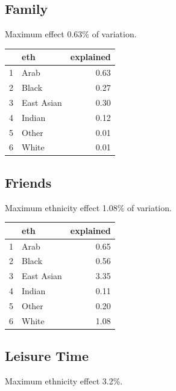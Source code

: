 \documentclass{amsart}
\begin{document}
\subsection{Family}

Maximum effect 0.63\% of variation.

\begin{table}[ht]
\centering
\begin{tabular}{rlr}
  \hline
 & eth & explained \\ 
  \hline
1 & Arab & 0.63 \\ 
  2 & Black & 0.27 \\ 
  3 & East Asian & 0.30 \\ 
  4 & Indian & 0.12 \\ 
  5 & Other & 0.01 \\ 
  6 & White & 0.01 \\ 
   \hline
\end{tabular}
\end{table}


\subsection{Friends}

Maximum ethnicity effect 1.08\% of variation.

\begin{table}[ht]
\centering
\begin{tabular}{rlr}
  \hline
 & eth & explained \\ 
  \hline
1 & Arab & 0.65 \\ 
  2 & Black & 0.56 \\ 
  3 & East Asian & 3.35 \\ 
  4 & Indian & 0.11 \\ 
  5 & Other & 0.20 \\ 
  6 & White & 1.08 \\ 
   \hline
\end{tabular}
\end{table}

\pagebreak

\subsection{Leisure Time}

Maximum ethnicity effect 3.2\%.
\end{document}
